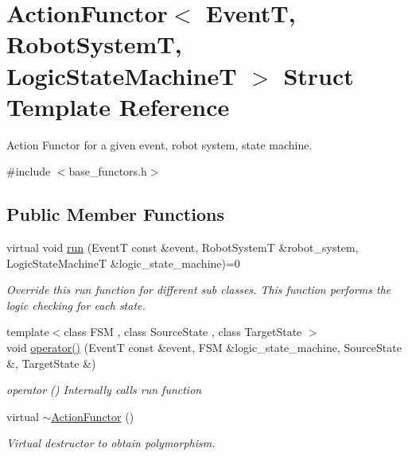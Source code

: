 \hypertarget{structActionFunctor}{\section{Action\-Functor$<$ Event\-T, Robot\-System\-T, Logic\-State\-Machine\-T $>$ Struct Template Reference}
\label{structActionFunctor}
}


Action Functor for a given event, robot system, state machine.  




{\ttfamily \#include $<$base\-\_\-functors.\-h$>$}

\subsection*{Public Member Functions}
\begin{DoxyCompactItemize}
\item 
virtual void \hyperlink{structActionFunctor_a97250a2cc027dc3ca7d10a975d11a5c7}{run} (Event\-T const \&event, Robot\-System\-T \&robot\-\_\-system, Logic\-State\-Machine\-T \&logic\-\_\-state\-\_\-machine)=0
\begin{DoxyCompactList}\small\item\em Override this run function for different sub classes. This function performs the logic checking for each state. \end{DoxyCompactList}\item 
{\footnotesize template$<$class F\-S\-M , class Source\-State , class Target\-State $>$ }\\void \hyperlink{structActionFunctor_adbf24aea135ecf5a0d470b290a5cab02}{operator()} (Event\-T const \&event, F\-S\-M \&logic\-\_\-state\-\_\-machine, Source\-State \&, Target\-State \&)
\begin{DoxyCompactList}\small\item\em operator () Internally calls run function \end{DoxyCompactList}\item 
virtual \hyperlink{structActionFunctor_aaaa4c1ce7204b370be55f2ef4a618258}{$\sim$\-Action\-Functor} ()
\begin{DoxyCompactList}\small\item\em Virtual destructor to obtain polymorphism. \end{DoxyCompactList}\end{DoxyCompactItemize}


